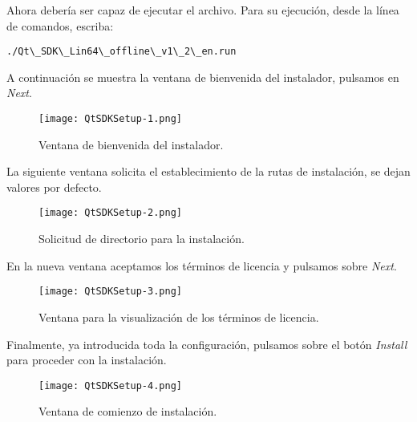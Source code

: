 Ahora debería ser capaz de ejecutar el archivo. Para su ejecución, desde la línea de comandos, escriba:\\

\begin{lstlisting}[style=consola]
./Qt\_SDK\_Lin64\_offline\_v1\_2\_en.run
\end{lstlisting}

A continuación se muestra la ventana de bienvenida del instalador, pulsamos en \emph{Next}.\\

\begin{figure}[H]
  \begin{center}
    \texttt{[image: QtSDKSetup-1.png]}
  \end{center}
  \caption{Ventana de bienvenida del instalador.}
  \label{opencv-ok}
\end{figure}

La siguiente ventana solicita el establecimiento de la rutas de instalación, se dejan valores por defecto.\\

\begin{figure}[H]
  \begin{center}
    \texttt{[image: QtSDKSetup-2.png]}
  \end{center}
  \caption{Solicitud de directorio para la instalación.}
  \label{opencv-ok}
\end{figure}

En la nueva ventana aceptamos los términos de licencia y pulsamos sobre \emph{Next}.\\

\begin{figure}[H]
  \begin{center}
    \texttt{[image: QtSDKSetup-3.png]}
  \end{center}
  \caption{Ventana para la visualización de los términos de licencia.}
  \label{opencv-ok}
\end{figure}

Finalmente, ya introducida toda la configuración, pulsamos sobre el botón \emph{Install} para proceder con la instalación. \\

\begin{figure}[H]
  \begin{center}
    \texttt{[image: QtSDKSetup-4.png]}
  \end{center}
  \caption{Ventana de comienzo de instalación.}
  \label{opencv-ok}
\end{figure}

